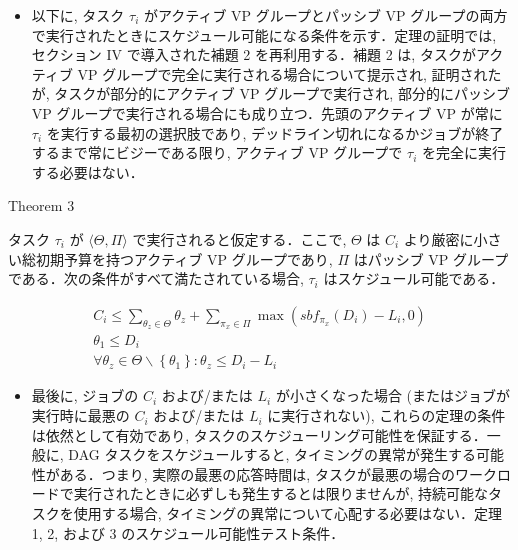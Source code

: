 \begin{frame}{}
    \begin{itemize}
        \item 以下に, タスク $\tau_{i}$ がアクティブ VP グループとパッシブ VP グループの両方で実行されたときにスケジュール可能になる条件を示す．定理の証明では, セクション IV で導入された補題 2 を再利用する．補題 2 は, タスクがアクティブ VP グループで完全に実行される場合について提示され, 証明されたが, タスクが部分的にアクティブ VP グループで実行され, 部分的にパッシブ VP グループで実行される場合にも成り立つ．先頭のアクティブ VP が常に $\tau_{i}$ を実行する最初の選択肢であり, デッドライン切れになるかジョブが終了するまで常にビジーである限り, アクティブ VP グループで $\tau_{i}$ を完全に実行する必要はない．
    \end{itemize}
\end{frame}

\begin{frame}[label=theorem3]{Theorem 3}
    \begin{theorem}[]
        タスク $\tau_{i}$ が $\langle\Theta, \Pi\rangle$ で実行されると仮定する．ここで, $\Theta$ は $C_{i}$ より厳密に小さい総初期予算を持つアクティブ VP グループであり, $\Pi$ はパッシブ VP グループである．次の条件がすべて満たされている場合, $\tau_{i}$ はスケジュール可能である．

        \begin{equation*}
            \begin{gathered}
                C_{i} \leq \sum_{\theta_{z} \in \Theta} \theta_{z}+\sum_{\pi_{x} \in \Pi} \max \left(s b f_{\pi_{x}}\left(D_{i}\right)-L_{i}, 0\right) \\
                \theta_{1} \leq D_{i} \\
                \forall \theta_{z} \in \Theta \backslash\left\{\theta_{1}\right\}: \theta_{z} \leq D_{i}-L_{i}
            \end{gathered}
        \end{equation*}
    \end{theorem}
\end{frame}

\begin{frame}{}
    \begin{itemize}
        \item 最後に, ジョブの $C_{i}$ および/または $L_{i}$ が小さくなった場合 (またはジョブが実行時に最悪の $C_{i}$ および/または $L_{i}$ に実行されない), これらの定理の条件は依然として有効であり, タスクのスケジューリング可能性を保証する．一般に, DAG タスクをスケジュールすると, タイミングの異常が発生する可能性がある．つまり, 実際の最悪の応答時間は, タスクが最悪の場合のワークロードで実行されたときに必ずしも発生するとは限りませんが, 持続可能なタスクを使用する場合, タイミングの異常について心配する必要はない．定理 1, 2, および 3 のスケジュール可能性テスト条件．
    \end{itemize}
\end{frame}
